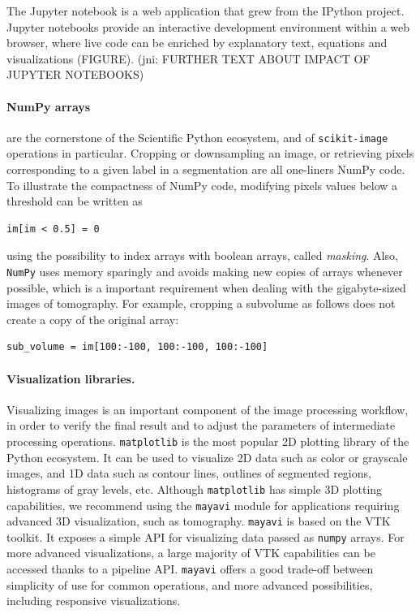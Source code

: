 \documentclass[twocolumn]{bmcart}%
\begin{document}
The Jupyter notebook \citep{Kluyver2016} is a web application that grew
from the IPython project. Jupyter notebooks provide an interactive development
environment within a web browser, where live code can be enriched
by explanatory text, equations and visualizations (FIGURE).
(jni: FURTHER TEXT ABOUT IMPACT OF JUPYTER NOTEBOOKS)

\paragraph{NumPy arrays} are the cornerstone of the Scientific Python
ecosystem, and of \texttt{scikit-image} operations in particular.
Cropping or downsampling an image, or retrieving pixels corresponding to
a given label in a segmentation are all one-liners NumPy code. To
illustrate the compactness of NumPy code, modifying pixels values below a
threshold can be written as
\begin{lstlisting}
im[im < 0.5] = 0
\end{lstlisting}
using the possibility to index arrays with boolean arrays, called
\emph{masking}. Also, \texttt{NumPy} uses memory sparingly and avoids
making new copies of arrays whenever possible, which is a important
requirement when dealing with the gigabyte-sized images of tomography.
For example, cropping a subvolume as follows does not create a copy of the
original array:
\begin{lstlisting}
sub_volume = im[100:-100, 100:-100, 100:-100]
\end{lstlisting}



\paragraph{Visualization libraries.}

Visualizing images is an important component of the image processing
workflow, in order to verify the final result and to adjust the
parameters of intermediate processing operations.
\texttt{matplotlib} \citep{Hunter2007} is the most popular 2D plotting
library of the Python ecosystem. It can be used to visualize 2D data such
as color or grayscale images, and 1D data such as contour lines, outlines
of segmented regions, histograms of gray levels, etc. Although
\texttt{matplotlib} has simple 3D plotting capabilities, we
recommend using the \texttt{mayavi} module \citep{Ramachandran2011}
for applications requiring advanced 3D visualization, such as tomography. 
\texttt{mayavi} is based on the VTK toolkit. It exposes a simple API for
visualizing data passed as \texttt{numpy} arrays. For more advanced
visualizations, a large majority of VTK capabilities can be accessed
thanks to a pipeline API.
\texttt{mayavi} offers a good trade-off between simplicity of use for
common operations, and more advanced possibilities, including responsive
visualizations.
\end{document}
